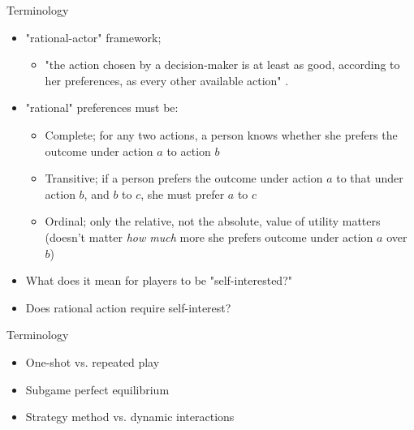 \documentclass[xcolor={dvipsnames},handout]{beamer}
\begin{document}
\begin{frame}{Terminology}

\begin{itemize}
\item "rational-actor" framework; 
\begin{itemize}
\item "the action chosen by a decision-maker is at least as good, according to her preferences, as every other available action" \cite[p.6]{osborne2004introduction}. 
\end{itemize}
\item "rational" preferences must be: 
\begin{itemize}
\item Complete;  for any two actions, a person knows whether she prefers the outcome under action $a$ to action $b$
\item Transitive;  if a person prefers the outcome under action $a$ to that under action $b$, and $b$ to $c$, she must prefer $a$ to $c$
\item Ordinal;  only the relative, not the absolute, value of utility matters (doesn't matter \emph{how much} more she prefers outcome under action $a$ over $b$)
\end{itemize}
\item What does it mean for players to be "self-interested?"
\item Does rational action require self-interest?
\end{itemize}

\end{frame}



\begin{frame}{Terminology}

\begin{itemize}
\item One-shot vs. repeated play 
\item Subgame perfect equilibrium 
\item Strategy method vs. dynamic interactions
\end{itemize}

\end{frame}
\end{document}
